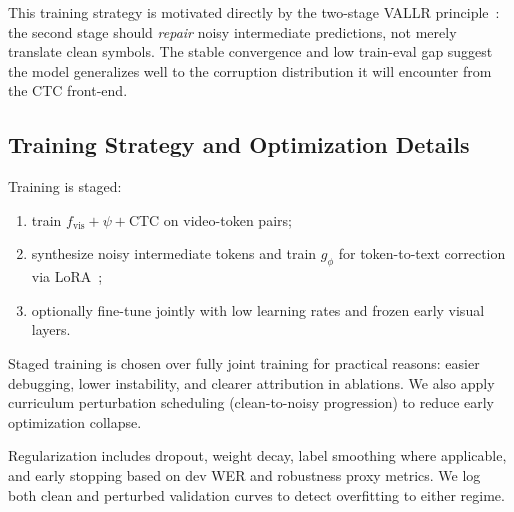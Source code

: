 \documentclass[10pt,twocolumn,letterpaper]{article}
\begin{document}
This training strategy is motivated directly by the two-stage VALLR principle~\cite{thomas2025vallr}: the second stage should \emph{repair} noisy intermediate predictions, not merely translate clean symbols. The stable convergence and low train-eval gap suggest the model generalizes well to the corruption distribution it will encounter from the CTC front-end.

\subsection{Training Strategy and Optimization Details}
Training is staged:
\begin{enumerate}[leftmargin=*]
    \item train $f_{\text{vis}}+\psi+$CTC on video-token pairs;
    \item synthesize noisy intermediate tokens and train $g_{\phi}$ for token-to-text correction via LoRA~\cite{hu2022lora};
    \item optionally fine-tune jointly with low learning rates and frozen early visual layers.
\end{enumerate}

Staged training is chosen over fully joint training for practical reasons: easier debugging, lower instability, and clearer attribution in ablations. We also apply curriculum perturbation scheduling (clean-to-noisy progression) to reduce early optimization collapse.

Regularization includes dropout, weight decay, label smoothing where applicable, and early stopping based on dev WER and robustness proxy metrics. We log both clean and perturbed validation curves to detect overfitting to either regime.
\end{document}

